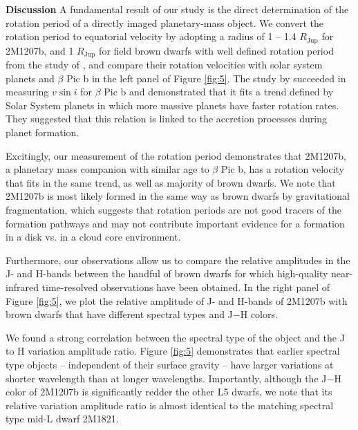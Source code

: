 \documentclass[12pt]{article}
\newcommand{\bpic}{$\beta$ Pic}
\newcommand{\vsini}{$v\sin i$}
\begin{document}
\textbf{Discussion}
A fundamental result of our study is the direct determination of the
rotation period of a directly imaged planetary-mass object. We
convert the rotation period to equatorial velocity  by adopting a radius of 1 -- 1.4
$R_{\mathrm{Jup}}$ for 2M1207b, and 1 $R_{\mathrm{Jup}}$ for field
brown dwarfs with well defined rotation period from the study of
\cite{Metchev2015}, and compare their rotation velocities with solar
system planets and \bpic{} b in the left
panel of Figure \ref{fig:5}.  The study by
\cite[][]{Snellen2014} succeeded in measuring \vsini{} for \bpic{} b
and demonstrated that it fits a trend defined by Solar System planets
in which more massive planets have faster rotation rates. They suggested
that this relation is linked to the accretion processes during planet formation.

Excitingly, our measurement of the rotation period demonstrates that
2M1207b, a planetary mass companion  with similar age to \bpic{} b, has a rotation velocity
that fits in the same trend, as well as majority of brown
dwarfs.
We note that 2M1207b is most likely formed in the same way as brown
dwarfs by gravitational fragmentation, which suggests
that rotation periods are not good tracers of the formation pathways
and may not contribute important evidence for a formation in a disk
vs. in a cloud core environment.

Furthermore, our observations allow us to compare the relative
amplitudes in the J- and H-bands between the handful of brown dwarfs
for which high-quality near-infrared time-resolved observations have
been obtained. In the right panel of Figure \ref{fig:5}, we plot the
relative amplitude of J- and H-bands of 2M1207b with brown dwarfs
\cite{Apai2013,Buenzli2012,Buenzli2015,Burgasser2013,Radigan2012,Yang2014} that
have different spectral types and J$-$H colors.

We found a strong correlation between the spectral type of the object
and the J to H variation amplitude ratio. Figure \ref{fig:5}
demonstrates that earlier spectral type objects -- independent of
their surface gravity -- have larger variations at shorter wavelength
than at longer wavelengths. Importantly, although the J$-$H color of
2M1207b is significantly redder the other L5 dwarfs, we note that its
relative variation amplitude ratio is almost identical to the matching
spectral type mid-L dwarf 2M1821. 
\end{document}
